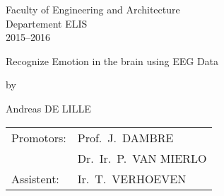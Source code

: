 

\begin{titlepage}

\setlength{\hoffset}{-1in}
\setlength{\voffset}{-1in}
\setlength{\topmargin}{1.5cm}
\setlength{\headheight}{0.5cm}
\setlength{\headsep}{1cm}
\setlength{\oddsidemargin}{3cm}
\setlength{\evensidemargin}{3cm}
\setlength{\footskip}{1.5cm}
\enlargethispage{1cm}


\fontsize{12pt}{14pt}
\selectfont

\begin{center}


\vspace{0.5cm}

Faculty of Engineering and Architecture\\
Departement ELIS\\
2015--2016 \\

\vspace{3.5cm}

\fontsize{17.28pt}{21pt}
\selectfont

Recognize Emotion in the brain using EEG Data

\fontsize{12pt}{14pt}
\selectfont

\vspace{.6cm}

by 

\vspace{.4cm}

Andreas DE LILLE

\vspace{3.5cm}


\begin{tabular}{ll}
Promotors: & Prof.~J.~DAMBRE\\
 & Dr.~Ir.~P.~VAN MIERLO\\
Assistent: & Ir.~T.~VERHOEVEN\\
\end{tabular}
 

\vspace{3cm}


\end{center}
\end{titlepage}
